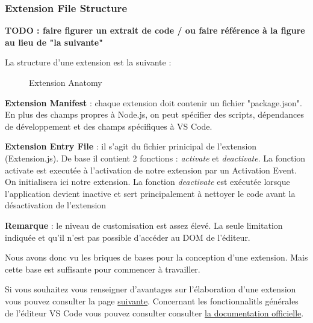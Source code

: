 \documentclass[
    iict, %
    il, %
]{heig-tb}
\begin{document}
\subsubsection{Extension File Structure}\label{Extension File Structure}

\textbf{TODO : faire figurer un extrait de code / ou faire référence à la figure au lieu de "la suivante" }

La structure d'une extension est la suivante :

\begin{figure}[!h]
    \begin{center}
    \end{center}
    \caption[Extension Anatomy]{\label{extension-anatomy} Extension Anatomy}
\end{figure}

\textbf{Extension Manifest} :
chaque extension doit contenir un fichier "package.json". En plus des champs propres à Node.js, on peut spécifier des scripts, dépendances de développement et des champs spécifiques à VS Code.

\textbf{Extension Entry File} :
il s'agit du fichier prinicipal de l'extension (Extension.js).
De base il contient 2 fonctions : \emph{activate} et \emph{deactivate}.
La fonction activate est executée à l'activation de notre extension par un Activation Event. On initialisera ici notre extension.
La fonction \emph{deactivate} est exécutée lorsque l'application devient inactive et sert principalement à nettoyer le code avant la désactivation de l'extension

\textbf{Remarque} : le niveau de customisation est assez élevé. La seule limitation indiquée et qu'il n'est pas possible d'accéder au DOM de l'éditeur.

Nous avons donc vu les briques de bases pour la conception d'une extension. Mais cette base est suffisante pour commencer à travailler.

Si vous souhaitez vous renseigner d'avantages sur l'élaboration d'une extension vous pouvez consulter la page \href{https://code.visualstudio.com/api}{suivante}.
Concernant les fonctionnalitls générales de l'éditeur VS Code vous pouvez consulter consulter \href{https://code.visualstudio.com/docs}{la documentation officielle}.
\end{document}
